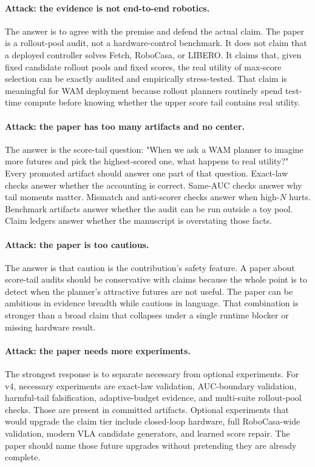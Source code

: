 \paragraph{Attack: the evidence is not end-to-end robotics.}
The answer is to agree with the premise and defend the actual claim. The paper
is a rollout-pool audit, not a hardware-control benchmark. It does not claim
that a deployed controller solves Fetch, RoboCasa, or LIBERO. It claims that,
given fixed candidate rollout pools and fixed scores, the real utility of
max-score selection can be exactly audited and empirically stress-tested. That
claim is meaningful for WAM deployment because rollout planners routinely
spend test-time compute before knowing whether the upper score tail contains
real utility.

\paragraph{Attack: the paper has too many artifacts and no center.}
The answer is the score-tail question: "When we ask a WAM planner to imagine
more futures and pick the highest-scored one, what happens to real utility?"
Every promoted artifact should answer one part of that question. Exact-law
checks answer whether the accounting is correct. Same-AUC checks answer why
tail moments matter. Mismatch and anti-scorer checks answer when high-$N$
hurts. Benchmark artifacts answer whether the audit can be run outside a toy
pool. Claim ledgers answer whether the manuscript is overstating those facts.

\paragraph{Attack: the paper is too cautious.}
The answer is that caution is the contribution's safety feature. A paper about
score-tail audits should be conservative with claims because the whole point
is to detect when the planner's attractive futures are not useful. The paper
can be ambitious in evidence breadth while cautious in language. That
combination is stronger than a broad claim that collapses under a single
runtime blocker or missing hardware result.

\paragraph{Attack: the paper needs more experiments.}
The strongest response is to separate necessary from optional experiments. For
v4, necessary experiments are exact-law validation, AUC-boundary validation,
harmful-tail falsification, adaptive-budget evidence, and multi-suite
rollout-pool checks. Those are present in committed artifacts. Optional
experiments that would upgrade the claim tier include closed-loop hardware,
full RoboCasa-wide validation, modern VLA candidate generators, and learned
score repair. The paper should name those future upgrades without pretending
they are already complete.

